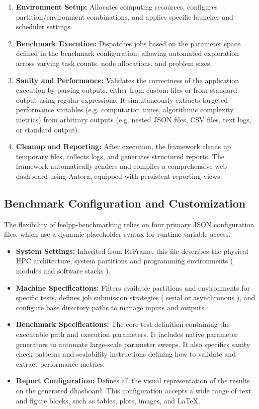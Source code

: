 \begin{enumerate}
\item \textbf{Environment Setup:} Allocates computing resources, configures partition/environment combinations, and applies specific launcher and scheduler settings.
\item \textbf{Benchmark Execution:} Dispatches jobs based on the parameter space defined in the benchmark configuration, allowing automated exploration across varying task counts, node allocations, and problem sizes.
\item \textbf{Sanity and Performance:} Validates the correctness of the application execution by parsing outputs, either from custom files or from standard output using regular expressions. It simultaneously extracts targeted performance variables (e.g. computation times, algorithmic complexity metrics) from arbitrary outputs (e.g. nested JSON files, CSV files, text logs, or standard output).
\item \textbf{Cleanup and Reporting:} After execution, the framework cleans up temporary files, collects logs, and generates structured reports. The framework automatically renders and compiles a comprehensive web dashboard using Antora, equipped with persistent reporting views.
\end{enumerate}


\subsection{Benchmark Configuration and Customization}

The flexibility of feelpp-benchmarking relies on four primary JSON configuration files, which use a dynamic placeholder syntax for runtime variable access.

\begin{itemize}
\item \textbf{System Settings:} Inherited from ReFrame, this file describes the physical HPC architecture, system partitions and programming environments ( modules and software stacks ).
\item \textbf{Machine Specifications:} Filters available partitions and environments for specific tests, defines job submission strategies ( serial or asynchronous ), and configure base directory paths to manage inputs and outputs.
\item \textbf{Benchmark Specifications:} The core test definition containing the executable path and execution parameters. It includes native parameter generators to automate large-scale parameter sweeps. It also specifies sanity check patterns and scalability instructions defining how to validate and extract performance metrics.
\item \textbf{Report Configuration:} Defines all the visual representation of the results on the generated dhasboard. This configuration accepts a wide range of text and figure blocks, such as tables, plots, images, and LaTeX.
\end{itemize}


